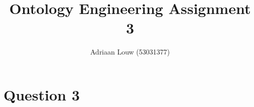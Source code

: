 \documentclass[12pt,a4paper]{article}
\title{Ontology Engineering Assignment 3}
\author{Adriaan Louw (53031377)}
\begin{document}
\section{Question 3}


\end{document}
